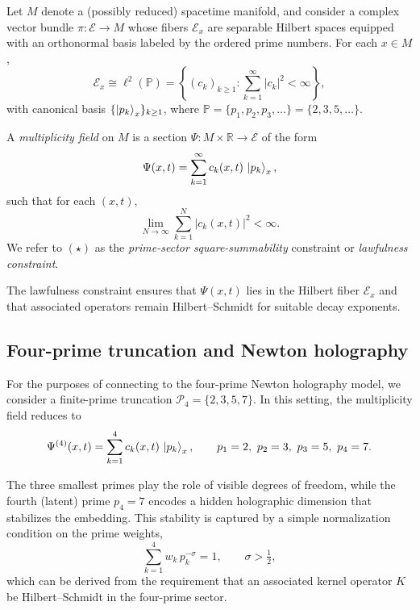 \documentclass[11pt]{article}
\begin{document}
Let \(M\) denote a (possibly reduced) spacetime manifold, and consider a
complex vector bundle \(\pi:\mathcal{E} \to M\) whose fibers
\(\mathcal{E}_x\) are separable Hilbert spaces equipped with an
orthonormal basis labeled by the ordered prime numbers.\cite{tunneling_topology_draft}
For each \(x\in M\),
\begin{equation}
  \mathcal{E}_x \cong \ell^2(\mathbb{P}) =
  \left\{ (c_k)_{k\ge 1} : \sum_{k=1}^\infty |c_k|^2 < \infty \right\},
\end{equation}
with canonical basis \(\{\ket{p_k}_x\}_{k\ge 1}\), where
\(\mathbb{P} = \{p_1,p_2,p_3,\dots\} = \{2,3,5,\dots\}\).

\begin{definition}
A \emph{multiplicity field} on \(M\) is a section
\(\Psi:M\times \mathbb{R}\to \mathcal{E}\) of the form
\begin{equation}
  \Psi(x,t) = \sum_{k=1}^\infty c_k(x,t)\, \ket{p_k}_x,
  \label{eq:psi_def}
\end{equation}
such that for each \((x,t)\),
\begin{equation}
  \lim_{N\to\infty} \sum_{k=1}^{N} |c_k(x,t)|^2 < \infty.
  \tag{\(\star\)}
\end{equation}
We refer to \((\star)\) as the \emph{prime-sector square-summability}
constraint or \emph{lawfulness constraint}.
\end{definition}

The lawfulness constraint ensures that \(\Psi(x,t)\) lies in the Hilbert
fiber \(\mathcal{E}_x\) and that associated operators remain
Hilbert--Schmidt for suitable decay exponents.\cite{tunneling_topology_draft}

\subsection{Four-prime truncation and Newton holography}

For the purposes of connecting to the four-prime Newton holography
model, we consider a finite-prime truncation
\(\mathcal{P}_4 = \{2,3,5,7\}\). In this setting, the multiplicity field
reduces to
\begin{equation}
  \Psi^{(4)}(x,t) = \sum_{k=1}^{4} c_k(x,t)\, \ket{p_k}_x,
  \qquad p_1=2,\ p_2=3,\ p_3=5,\ p_4=7.
\end{equation}

The three smallest primes play the role of visible degrees of freedom,
while the fourth (latent) prime \(p_4=7\) encodes a hidden holographic
dimension that stabilizes the embedding.\cite{newton_holography_draft}
This stability is captured by a simple normalization condition on the
prime weights,
\begin{equation}
  \sum_{k=1}^{4} w_k\,p_k^{-\sigma} = 1,
  \qquad \sigma > \tfrac{1}{2},
  \label{eq:closure_condition}
\end{equation}
which can be derived from the requirement that an associated kernel
operator \(K\) be Hilbert--Schmidt in the four-prime sector.\cite{newton_holography_draft}
\end{document}
